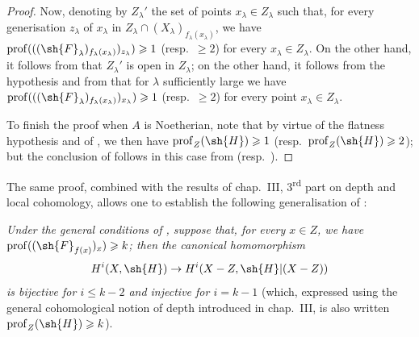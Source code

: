 \begin{proof}
Now, denoting by $Z_\lambda'$ the set of points $x_\lambda\in Z_\lambda$ such that, for every generisation $z_\lambda$ of $x_\lambda$ in $Z_\lambda\cap(X_\lambda)_{f_\lambda(x_\lambda)}$, we have $\operatorname{prof}(((\sh{F}_\lambda)_{f_\lambda(x_\lambda)})_{z_\lambda})\geqslant 1$ (resp.\ $\geqslant 2$) for every $x_\lambda\in Z_\lambda$.
On the other hand, it follows from  that $Z_\lambda'$ is open in $Z_\lambda$; on the other hand, it follows from the hypothesis and from  that for $\lambda$ sufficiently large we have $\operatorname{prof}(((\sh{F}_\lambda)_{f_\lambda(x_\lambda)})_{x_\lambda})\geqslant 1$ (resp.\ $\geqslant 2$) for every point $x_\lambda\in Z_\lambda$.

To finish the proof when $A$ is Noetherian, note that by virtue of the flatness hypothesis and of , we then have $\operatorname{prof}_Z(\sh{H})\geqslant 1$ (resp.\ $\operatorname{prof}_Z(\sh{H})\geqslant 2$); but the conclusion of  follows in this case from  (resp.\ ).
\end{proof}

\begin{remark}[19.9.9]
\label{IV.19.9.9}
The same proof, combined with the results of chap.~III, 3\textsuperscript{rd} part on depth and local cohomology, allows one to establish the following generalisation of :

\emph{Under the general conditions of , suppose that, for every $x\in Z$, we have $\operatorname{prof}((\sh{F}_{f(x)})_x)\geqslant k$; then the canonical homomorphism}
\[
  H^i(X,\sh{H})\to H^i(X-Z,\sh{H}|(X-Z))
\]
\emph{is bijective for $i\leqslant k-2$ and injective for $i=k-1$} (which, expressed using the general cohomological notion of depth introduced in chap.~III, is also written $\operatorname{prof}_Z(\sh{H})\geqslant k$).
\end{remark}

